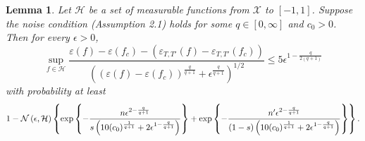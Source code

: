 \documentclass{article}
\newtheorem{lemma}{Lemma}
\begin{document}
\begin{lemma}\label{uniformBernstein}
Let ${\mathcal H}$ be a set of measurable functions from ${\mathcal X}$ to $[-1, 1]$. Suppose the noise condition (Assumption 2.1) holds for some $q\in [0, \infty]$ and $c_0 >0$. Then for every
$\epsilon>0$, 
$$\sup_{f\in {\mathcal H}} \frac{\varepsilon (f) - \varepsilon (f_c) - \left(\varepsilon_{T, T'} (f) - \varepsilon_{T, T'} (f_c)\right)}{\left(\left(\varepsilon (f) - \varepsilon (f_c)\right)^{\frac{q}{q+1}} + \epsilon^{\frac{q}{q+1}}\right)^{1/2}} \leq 5 \epsilon^{1-{\frac{q}{2(q+1)}}}
$$
with probability at least 
\begin{eqnarray*}
1-  {\mathcal N}\left(\epsilon, {\mathcal H}\right) 
\left\{\exp \left\{-
{n \epsilon^{2-{\frac{q}{q+1}}} \over s\left(10 (c_0)^{\frac{1}{q+1}} +2 \epsilon^{1-{\frac{q}{q+1}}}\right)}\right\}
 +\exp \left\{-
{n' \epsilon^{2-{\frac{q}{q+1}}} \over (1-s) \left(10 (c_0)^{\frac{1}{q+1}} +2 \epsilon^{1-{\frac{q}{q+1}}}\right)}\right\}\right\}. 
\end{eqnarray*}
\end{lemma}
\end{document}
